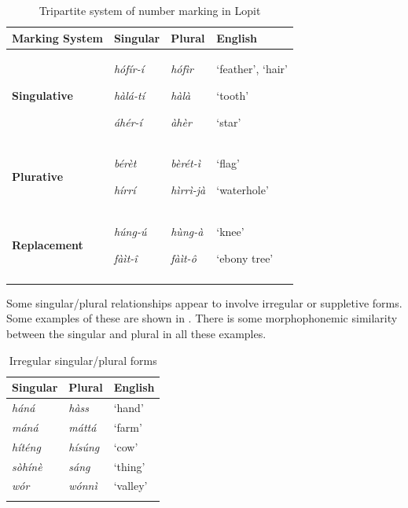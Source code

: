 \documentclass[output=paper]{langsci/langscibook}
\begin{document}
\begin{table}
\begin{tabularx}{\textwidth}{XXXX}
\lsptoprule

 \bfseries Marking System & \bfseries Singular & \bfseries Plural & \bfseries English\\ \midrule
\bfseries Singulative & {\itshape h\'{o}f\'{i}r-\'{i}}

{\itshape h\`{a}l\'{a}-t\'{i}}

\itshape \'{a}h\'{e}r-\'{i} & {\itshape h\'{o}f\`{i}r}

{\itshape h\`{a}l\`{a}}

\itshape \`{a}h\`{e}r & ‘feather’, ‘hair’

‘tooth’

‘star’\\
\bfseries Plurative & {\itshape b\'{e}r\`{e}t}

\itshape h\'{i}rr\'{i} & {\itshape b\`{e}r\'{e}t-\`{i}}

\itshape h\`{i}rr\`{i}-j\`{a} & ‘flag’

‘waterhole’\\
\bfseries Replacement & {\itshape h\'{u}ng-\'{u}}

\itshape f\`{a}\`{i}t-\^{i} & {\itshape h\`{u}ng-\`{a}}

\itshape f\`{a}\`{i}t-\^{o} & ‘knee’

‘ebony tree’\\
\lspbottomrule
\end{tabularx}
\caption{Tripartite system of number marking in Lopit}
\label{tab:moodie:2}
\end{table}

Some singular/plural relationships appear to involve irregular or suppletive forms. Some examples of these are shown in . There is some morphophonemic similarity between the singular and plural in all these examples. 

\begin{table}
\begin{tabularx}{\textwidth}{XXX}
\lsptoprule
 \bfseries Singular & \bfseries Plural & \bfseries English\\ \midrule
\itshape h\'{a}n\'{a} & \itshape h\`{a}ss & ‘hand’\\
\itshape m\'{a}n\'{a} & \itshape m\'{a}tt\'{a} & ‘farm’\\
\itshape h\'{i}t\'{e}ng & \itshape h\'{i}s\'{u}ng & ‘cow’\\
\itshape s\`{o}h\'{i}n\`{e} & \itshape s\'{a}ng & ‘thing’\\
\itshape w\'{o}r & \itshape w\'{o}nn\`{i} & ‘valley’\\
\lspbottomrule
\end{tabularx}
\caption{Irregular singular/plural forms}
\label{tab:moodie:3}
\end{table}
\end{document}
